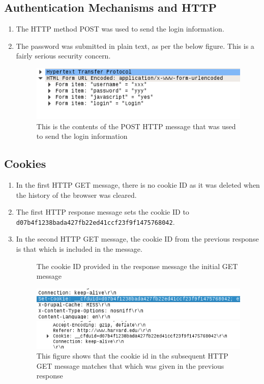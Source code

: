 \documentclass[12pt]{article}
\begin{document}
\subsection{Authentication Mechanisms and HTTP}
\begin{enumerate}[label=\textbf{Question \arabic*)}, resume]
	\item The HTTP method POST was used to send the login information.
	\item The password was submitted in plain text, as per the below figure. This is a fairly serious security concern.
		\begin{figure}[h]
			\caption{This is the contents of the POST HTTP message that was used to send the login information}
			\center
			\includegraphics{http_login}
		\end{figure}
\end{enumerate}

\subsection{Cookies}
\begin{enumerate}[label=\textbf{Question \arabic*)}, resume]
	\item In the first HTTP GET message, there is no cookie ID as it was deleted when the history of the browser was cleared.
	\item The first HTTP response message sets the cookie ID to\\
	         \texttt{d07b4f1238bada427fb22ed41ccf23f9f1475768042}.
	\item In the second HTTP GET message, the cookie ID from the previous response is that which is included in the message. 
		\begin{figure}[!t]
			\caption{The cookie ID provided in the response message the initial GET message}
			\center
			\includegraphics{http_cookie_resp}
			\caption{This figure shows that the cookie id in the subsequent HTTP GET message matches that which was given in the previous response}
			\center
			\includegraphics{http_cookie_get}
		\end{figure}
\end{enumerate}
\end{document}
